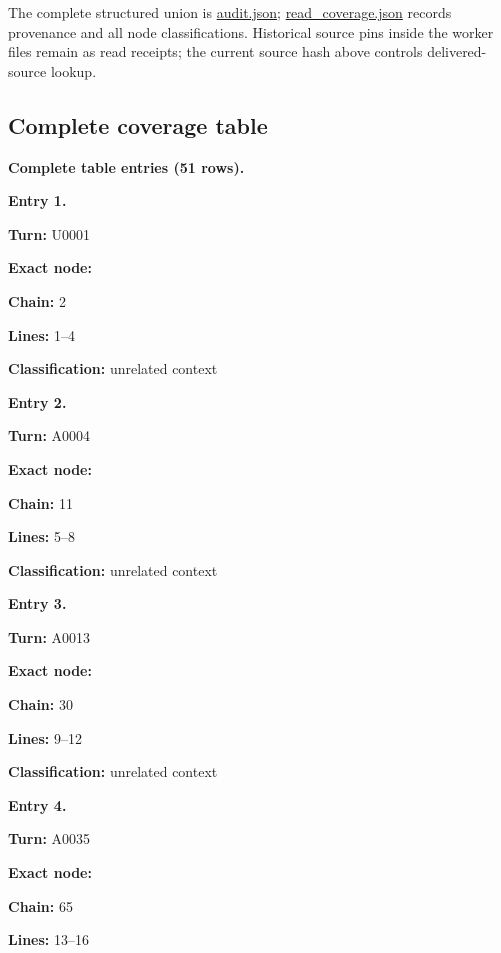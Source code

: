 \documentclass[10pt,a4paper,oneside]{report}
\begin{document}
The complete structured union is \url{audit.json};
\url{read_coverage.json} records provenance and all node
classifications. Historical source pins inside the worker files remain
as read receipts; the current source hash above controls
delivered-source lookup.

\subsection{Complete coverage table}\label{complete-coverage-table}

\textbf{Complete table entries (51 rows).}


\textbf{Entry 1.}

\textbf{Turn:} U0001

\textbf{Exact node:} \protect{}

\textbf{Chain:} 2

\textbf{Lines:} 1--4

\textbf{Classification:} unrelated context


\textbf{Entry 2.}

\textbf{Turn:} A0004

\textbf{Exact node:} \protect{}

\textbf{Chain:} 11

\textbf{Lines:} 5--8

\textbf{Classification:} unrelated context


\textbf{Entry 3.}

\textbf{Turn:} A0013

\textbf{Exact node:} \protect{}

\textbf{Chain:} 30

\textbf{Lines:} 9--12

\textbf{Classification:} unrelated context


\textbf{Entry 4.}

\textbf{Turn:} A0035

\textbf{Exact node:} \protect{}

\textbf{Chain:} 65

\textbf{Lines:} 13--16
\end{document}
